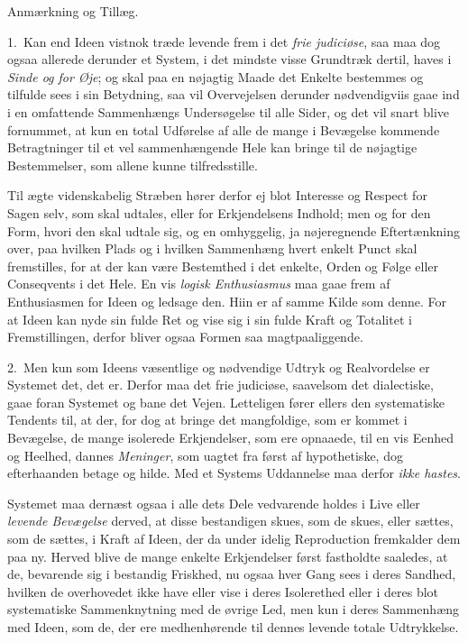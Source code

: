 \documentclass[12pt,a4paper]{book}
\newcommand{\apage}[1]{\marginnote{\footnotesize\textit{[#1]}}}
\begin{document}
\begin{center}Anmærkning og Tillæg.\end{center}

1.~Kan end Ideen vistnok træde levende frem i det \emph{frie judiciøse}, saa maa
dog ogsaa allerede derunder et System, i det mindste visse Grundtræk dertil, haves
i \emph{Sinde og for Øje}; \apage{136}  og skal paa en nøjagtig Maade det Enkelte bestemmes og
tilfulde sees i sin Betydning, saa vil Overvejelsen derunder nødvendigviis gaae
ind i en omfattende Sammenhængs Undersøgelse til alle Sider, og det vil snart
blive fornummet, at kun en total Udførelse af alle de mange i Bevægelse kommende
Betragtninger til et vel sammenhængende Hele kan bringe til de nøjagtige
Bestemmelser, som allene kunne tilfredsstille.

Til ægte videnskabelig Stræben hører derfor ej blot Interesse og Respect for Sagen
selv, som skal udtales, eller for Erkjendelsens Indhold; men og for den Form, hvori
den skal udtale sig, og en omhyggelig, ja nøjeregnende Eftertænkning over, paa
hvilken Plads og i hvilken Sammenhæng hvert enkelt Punct skal fremstilles, for at
der kan være Bestemthed i det enkelte, Orden og Følge eller Conseqvents i det
Hele. En vis \emph{logisk Enthusiasmus} maa gaae frem af Enthusiasmen for Ideen og
ledsage den. Hiin er af samme Kilde som denne. For at Ideen kan nyde sin fulde Ret
og vise sig i sin fulde Kraft og Totalitet i Fremstillingen, derfor bliver ogsaa
Formen saa magtpaaliggende.

2.~Men kun som Ideens væsentlige og nødvendige Udtryk og Realvordelse er Systemet
det, det er. Derfor maa det frie judiciøse, saavelsom det dialectiske, gaae foran
Systemet og bane det Vejen. Letteligen fører ellers den systematiske \apage{137}  Tendents til,
at der, for dog at bringe det mangfoldige, som er kommet i Bevægelse, de mange
isolerede Erkjendelser, som ere opnaaede, til en vis Eenhed og Heelhed, dannes
\emph{Meninger}, som uagtet fra først af hypothetiske, dog efterhaanden betage og
hilde. Med et Systems Uddannelse maa derfor \emph{ikke hastes}.

Systemet maa dernæst ogsaa i alle dets Dele vedvarende holdes i Live eller
\emph{levende Bevægelse} derved, at disse bestandigen skues, som de skues, eller
sættes, som de sættes, i Kraft af Ideen, der da under idelig Reproduction
fremkalder dem paa ny. Herved blive de mange enkelte Erkjendelser først fastholdte
saaledes, at de, bevarende sig i bestandig Friskhed, nu ogsaa hver Gang sees i
deres Sandhed, hvilken de overhovedet ikke have eller vise i deres Isolerethed
eller i deres blot systematiske Sammenknytning med de øvrige Led, men kun i deres
Sammenhæng med Ideen, som de, der ere medhenhørende til dennes levende totale
Udtrykkelse.
\end{document}
